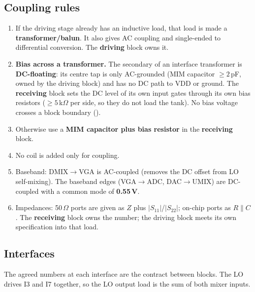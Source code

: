 \subsection{Coupling rules}
\begin{enumerate}
	\item If the driving stage already has an inductive load, that load is made a
	      \textbf{transformer/balun}. It also gives AC coupling and single-ended to
	      differential conversion. The \textbf{driving} block owns it.
	\item \textbf{Bias across a transformer.} The secondary of an interface transformer
	      is \textbf{DC-floating}: its centre tap is only AC-grounded (MIM capacitor
	      $\geq 2$\,pF, owned by the driving block) and has no DC path to VDD or ground.
	      The \textbf{receiving} block sets the DC level of its own input gates through
	      its own bias resistors ($\geq 5$\,k$\Omega$ per side, so they do not load the
	      tank). No bias voltage crosses a block boundary ().
	\item Otherwise use a \textbf{MIM capacitor plus bias resistor} in the \textbf{receiving} block.
	\item No coil is added only for coupling.
	\item Baseband: DMIX$\to$VGA is AC-coupled (removes the DC offset from LO
	      self-mixing). The baseband edges (VGA$\to$ADC, DAC$\to$UMIX) are
	      DC-coupled with a common mode of \textbf{0.55\,V}.
	\item Impedances: 50\,$\Omega$ ports are given as $Z$ plus $|S_{11}|$/$|S_{22}|$;
	      on-chip ports as $R \parallel C$. The \textbf{receiving} block owns the number;
	      the driving block meets its own specification into that load.
\end{enumerate}

\subsection{Interfaces}\label{sec:integrator-interfaces}
The agreed numbers at each interface are the contract between blocks. The LO drives
I3 and I7 together, so the LO output load is the sum of both mixer inputs.

